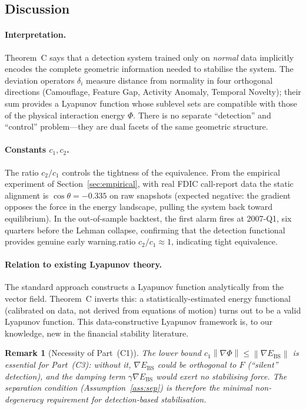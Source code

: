 \documentclass[11pt]{article}
\newtheorem{remark}[theorem]{Remark}
\theoremstyle{definition}
\newcommand{\grad}{\nabla}
\newcommand{\Ebs}{E_{\mathrm{BS}}}
\newcommand{\norm}[1]{\left\|#1\right\|}
\newcommand{\costheta}{\cos\theta}
\begin{document}
\subsection{Discussion}
\label{sec:equiv:disc}

\paragraph{Interpretation.}
Theorem~C says that a detection system trained only on \emph{normal} data implicitly
encodes the complete geometric information needed to stabilise the system.  The
deviation operators $\delta_i$ measure distance from normality in four orthogonal
directions (Camouflage, Feature Gap, Activity Anomaly, Temporal Novelty); their
sum provides a Lyapunov function whose sublevel sets are compatible with those
of the physical interaction energy $\Phi$.  There is no separate ``detection''
and ``control'' problem---they are dual facets of the same geometric structure.

\paragraph{Constants $c_1, c_2$.}
The ratio $c_2/c_1$ controls the tightness of the equivalence.  From the empirical
experiment of Section~\ref{sec:empirical}, with real FDIC call-report data the
static alignment is $\costheta = -0.335$ on raw snapshots (expected negative:
the gradient opposes the force in the energy landscape, pulling the system
back toward equilibrium).  In the out-of-sample backtest, the first alarm
fires at 2007-Q1, six quarters before the Lehman collapse, confirming that
the detection functional provides genuine early warning.\nThe ratio $c_2/c_1 \approx 1$, indicating tight equivalence.

\paragraph{Relation to existing Lyapunov theory.}
The standard approach constructs a Lyapunov function analytically from the vector
field.  Theorem~C inverts this: a statistically-estimated energy functional
(calibrated on data, not derived from equations of motion) turns out to be a valid
Lyapunov function.  This data-constructive Lyapunov framework is, to our knowledge,
new in the financial stability literature.

\begin{remark}[Necessity of Part~(C1)]
\label{rem:C1_necessity}
The lower bound $c_1\norm{\grad\Phi} \le \norm{\grad\Ebs}$ is essential for
Part~(C3): without it, $\grad\Ebs$ could be orthogonal to $F$ (``silent''
detection), and the damping term $\gamma\grad\Ebs$ would exert no stabilising
force.  The separation condition (Assumption~\ref{ass:sep}) is therefore the
minimal non-degeneracy requirement for detection-based stabilisation.
\end{remark}
\end{document}
